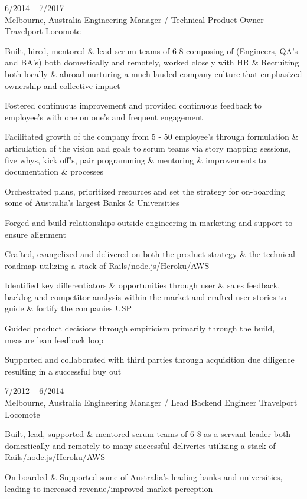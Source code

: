 \documentclass[9pt]{developercv} %
\begin{document}
\begin{entrylist}
{    }
	\entry
		{6/2014 -- 7/2017\\\footnotesize{Melbourne, Australia}}
		{Engineering Manager / Technical Product Owner}
		{Travelport Locomote}
    {Built, hired, mentored \& lead scrum teams of 6-8  composing of (Engineers,
    QA’s and BA’s) both domestically and remotely, worked closely with HR \&
    Recruiting both locally \& abroad nurturing a much lauded company culture
    that emphasized ownership and collective impact
    \par\medskip Fostered continuous improvement and provided continuous feedback to employee’s with one on one’s and frequent engagement
    \par\medskip Facilitated growth of the company from 5 - 50 employee’s through formulation \& articulation of the vision and goals to scrum teams via story mapping sessions, five whys, kick off's, pair programming \& mentoring \& improvements to documentation \& processes
    \par\medskip Orchestrated plans, prioritized resources and set the strategy for on-boarding some of Australia’s largest Banks \& Universities
    \par\medskip Forged and build relationships outside engineering in marketing and support to ensure alignment
    \par\medskip Crafted, evangelized and delivered on both the product strategy \& the technical roadmap  utilizing a stack of  Rails/node.js/Heroku/AWS
    \par\medskip Identified key differentiators \& opportunities through user \& sales feedback, backlog and competitor analysis within the market and crafted user stories to guide \& fortify the companies USP
    \par\medskip Guided product decisions through empiricism primarily through the build, measure lean feedback loop
    \par\medskip Supported and collaborated with third parties through acquisition due diligence resulting in a successful buy out}
	\entry
		{7/2012 -- 6/2014\\\footnotesize{Melbourne, Australia}}
		{Engineering Manager / Lead Backend Engineer}
		{Travelport Locomote}
    {Built, lead, supported \& mentored scrum teams of 6-8 as a servant leader both domestically and remotely to many successful deliveries utilizing a stack of  Rails/node.js/Heroku/AWS
    \par\medskip On-boarded \& Supported some of Australia's leading banks and universities, leading to increased revenue/improved market perception
}
\end{entrylist}
\end{document}
